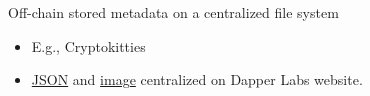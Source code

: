 \documentclass[handout]{beamer}
\begin{document}
\begin{frame}{Off-chain stored metadata on a centralized file system}
\begin{itemize}
	\item E.g., Cryptokitties
	\item \link \href{https://api.cryptokitties.co/kitties/2252}{JSON} and \link \href{https://img.cn.cryptokitties.co/0x06012c8cf97bead5deae237070f9587f8e7a266d/2252.svg} {image} centralized on Dapper Labs website.
\end{itemize}

\end{frame}


%	
%	
\end{document}
